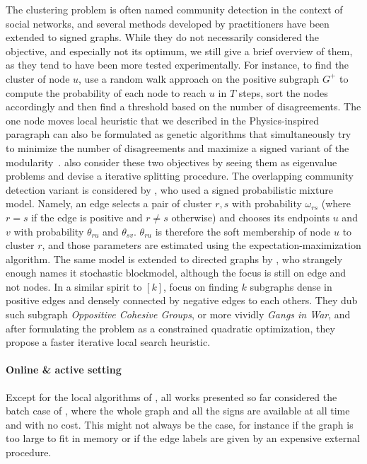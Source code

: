 The clustering problem is often named community detection in the context of social networks, and
several methods developed by practitioners have been extended to signed graphs. While they do not
necessarily considered the \pcc{} objective, and especially not its optimum, we still give a brief
overview of them, as they tend to have been more tested experimentally. For instance, to find the
cluster of node $u$, \textcite{Yang2007} use a random walk approach on the positive subgraph $G^+$
to compute the probability of each node to reach $u$ in $T$ steps, sort the nodes accordingly and
then find a threshold  based on the number of disagreements.
The one node moves local heuristic that we described in the Physics-inspired paragraph
 can also be formulated as genetic algorithms that simultaneously try to
minimize the number of disagreements and maximize a signed variant of the
modularity~\autocites{Li2013}{Amelio2013}. \Textcite{Anchuri2012} also consider these two objectives
by seeing them as eigenvalue problems and devise a iterative splitting procedure.
The overlapping community detection variant is considered by \textcite{Chen14}, who used a signed
probabilistic mixture model. Namely, an edge selects a pair of cluster $r,s$ with probability
$\omega_{rs}$ (where $r=s$ if the edge is positive and $r\neq s$ otherwise) and chooses its endpoints
$u$ and $v$ with probability $\theta_{ru}$ and $\theta_{sv}$. $\theta_{ru}$ is therefore the soft
membership of node $u$ to cluster $r$, and those parameters are estimated using the
expectation-maximization algorithm. The same model is extended to directed graphs by
\textcite{Jiang2015}, who strangely enough names it stochastic blockmodel, although the focus is
still on edge and not nodes.
In a similar spirit to \maxa{}$[k]$, \textcite{SignedGang} focus on finding $k$ subgraphs dense in
positive edges and densely connected by negative edges to each others. They dub such subgraph
\emph{Oppositive Cohesive Groups}, or more vividly \emph{Gangs in War}, and after formulating the
problem as a constrained quadratic optimization, they propose a faster iterative local search
heuristic.

\paragraph{Online \& active setting}

Except for the local algorithms of \textcite{Bonchi2013}, all works presented so far considered the
batch case of \pcc{}, where the whole graph and all the signs are available at all time and with no
cost. This might not always be the case, for instance if the graph is too large to fit in memory or
if the edge labels are given by an expensive external procedure.

